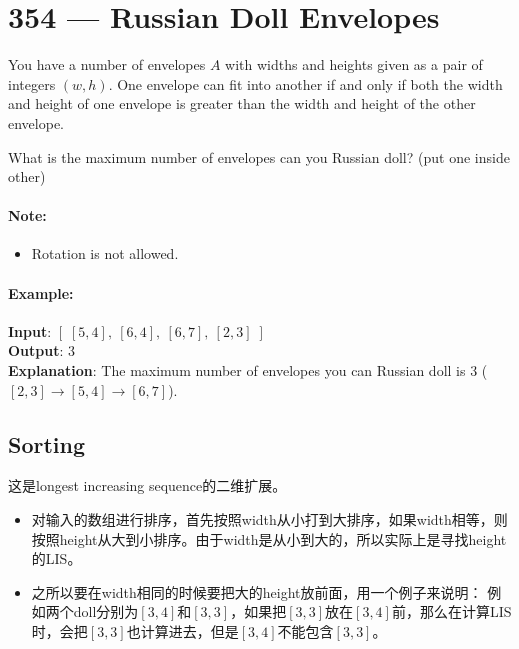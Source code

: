 \section{354 --- Russian Doll Envelopes}
You have a number of envelopes $A$ with widths and heights given as a pair of integers $(w, h)$. One envelope can fit into another if and only if both the width and height of one envelope is greater than the width and height of the other envelope.
\par

What is the maximum number of envelopes can you Russian doll? (put one inside other)

\paragraph{Note:}
\begin{itemize}
\item Rotation is not allowed.
\end{itemize}

\paragraph{Example:}

\begin{flushleft}
\textbf{Input}: $\left[\;[5,4],\ [6,4],\ [6,7],\ [2,3]\;\right]$
\\
\textbf{Output}: 3 
\\
\textbf{Explanation}: The maximum number of envelopes you can Russian doll is 3 ($[2,3] \longrightarrow [5,4] \longrightarrow [6,7]$).
\end{flushleft}

\subsection{Sorting}
这是longest increasing sequence的二维扩展。
\begin{itemize}
\item 对输入的数组进行排序，首先按照width从小打到大排序，如果width相等，则按照height从大到小排序。由于width是从小到大的，所以实际上是寻找height的LIS。
\item 之所以要在width相同的时候要把大的height放前面，用一个例子来说明： 例如两个doll分别为$[3, 4]$和$[3, 3]$，如果把$[3,3]$放在$[3,4]$前，那么在计算LIS时，会把$[3,3]$也计算进去，但是$[3,4]$不能包含$[3,3]$。
\end{itemize}

